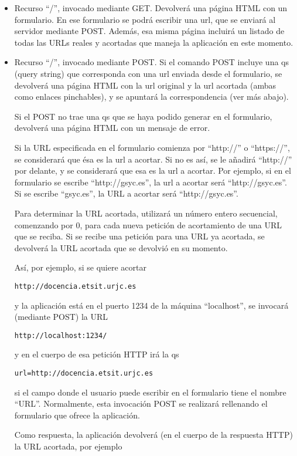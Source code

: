 \begin{itemize}
\item Recurso ``/'', invocado mediante GET. Devolverá una página HTML con un formulario. En ese formulario se podrá escribir una url, que se enviará al servidor mediante POST. Además, esa misma página incluirá un listado de todas las URLs reales y acortadas que maneja la aplicación en este momento.

\item Recurso ``/'', invocado mediante POST. Si el comando POST incluye una qs (query string) que corresponda con una url enviada desde el formulario, se devolverá una página HTML con la url original y la url acortada (ambas como enlaces pinchables), y se apuntará la correspondencia (ver más abajo).

Si el POST no trae una qs que se haya podido generar en el formulario, devolverá una página HTML con un mensaje de error.

Si la URL especificada en el formulario comienza por ``http://'' o ``https://'', se considerará que ésa es la url a acortar. Si no es así, se le añadirá ``http://'' por delante, y se considerará que esa es la url a acortar. Por ejemplo, si en el formulario se escribe ``http://gsyc.es'', la url a acortar será ``http://gsyc.es''. Si se escribe ``gsyc.es'', la URL a acortar será ``http://gsyc.es''.

Para determinar la URL acortada, utilizará un número entero secuencial, comenzando por 0, para cada nueva petición de acortamiento de una URL que se reciba. Si se recibe una petición para una URL ya acortada, se devolverá la URL acortada que se devolvió en su momento.

Así, por ejemplo, si se quiere acortar

\verb|http://docencia.etsit.urjc.es|

y la aplicación está en el puerto 1234 de la máquina ``localhost'', se invocará (mediante POST) la URL

\verb|http://localhost:1234/|

y en el cuerpo de esa petición HTTP irá la qs

\verb|url=http://docencia.etsit.urjc.es|

si el campo donde el usuario puede escribir en el formulario tiene el nombre ``URL''. Normalmente, esta invocación POST se realizará rellenando el formulario que ofrece la aplicación.

Como respuesta, la aplicación devolverá (en el cuerpo de la respuesta HTTP) la URL acortada, por ejemplo


\end{itemize}
